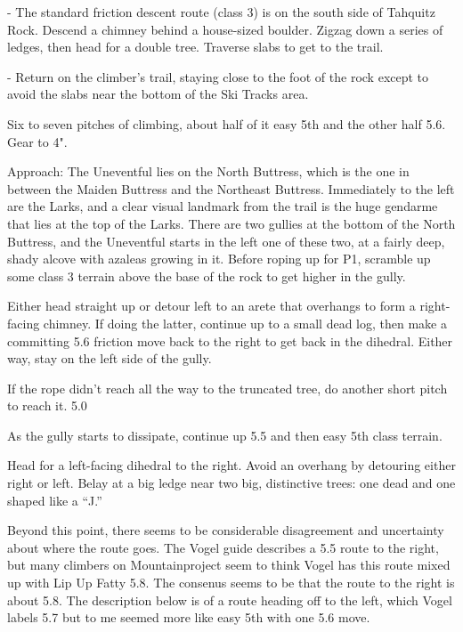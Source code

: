 \documentclass{tahquitz}
\begin{document}
- The standard friction descent route (class 3) is on the south side
of Tahquitz Rock. Descend a chimney behind a house-sized boulder.
Zigzag down a series of ledges, then head for a double tree. Traverse
slabs to get to the trail.

- Return on the climber's trail, staying close to the foot of the
rock except to avoid the slabs near the bottom of the Ski Tracks area.





Six to seven pitches of climbing, about half of it easy 5th and the
other half 5.6. Gear to 4".

Approach: The Uneventful lies on the North Buttress, which is the one
in between the Maiden Buttress and the Northeast Buttress. Immediately
to the left are the Larks, and a clear visual landmark from the trail
is the huge gendarme that lies at the top of the Larks. There are two
gullies at the bottom of the North Buttress, and the Uneventful starts in the
left one of these two, at a fairly deep, shady alcove with azaleas
growing in it. Before roping up for P1, scramble up some class 3 terrain
above the base of the rock to get higher in the gully.

 Either head straight up or detour left to an arete that overhangs
to form a right-facing chimney. If doing the latter, continue up
to a small dead log, then make a committing 5.6 friction
move back to the right to get back in the dihedral. Either way, stay on
the left side of the gully.

 If the rope didn't reach all the way to the truncated tree,
do another short pitch to reach it. 5.0

 As the gully starts to dissipate, continue up 5.5 and then easy
5th class terrain.

 Head for a left-facing dihedral to the right. Avoid an overhang
by detouring either right or left. Belay at a big ledge near two big, distinctive
trees: one dead and one shaped like a ``J.''

Beyond this point, there seems to be considerable disagreement and uncertainty
about where the route goes. The Vogel guide describes a 5.5 route to the right,
but many climbers on Mountainproject seem to think Vogel has this route mixed
up with Lip Up Fatty 5.8. The consenus seems to be that the route to the right
is about 5.8. The description below is of a route heading off to the left, which
Vogel labels 5.7 but to me seemed more like easy 5th with one 5.6 move.
\end{document}

